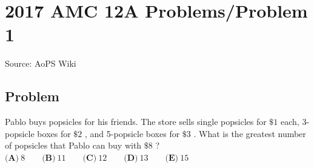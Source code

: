 \documentclass[12pt]{article}
\begin{document}
\section*{{2017 AMC 12A Problems/Problem 1}}
Source: AoPS Wiki

\subsection*{Problem}
Pablo buys popsicles for his friends. The store sells single popsicles for $\$1$ each, 3-popsicle boxes for $\$2$ , and 5-popsicle boxes for $\$3$ . What is the greatest number of popsicles that Pablo can buy with $\$8$ ? $\textbf{(A)}\ 8\qquad\textbf{(B)}\ 11\qquad\textbf{(C)}\ 12\qquad\textbf{(D)}\ 13\qquad\textbf{(E)}\ 15$
\end{document}
